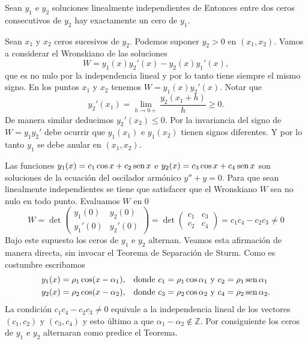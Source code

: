 \begin{teorema}\label{sep_sturm} Sean $y_1$ e $y_2$ soluciones linealmente independientes de 
Entonces entre dos ceros consecutivos de $y_2$ hay exactamente un cero de $y_1$. \end{teorema}
\begin{demo} Sean $x_1$ y $x_2$ ceros sucesivos de $y_2$. Podemos suponer $y_2>0$ en $(x_1,x_2)$. Vamos a considerar el Wronskiano de las soluciones
\[W=y_1(x)y_2'(x)-y_2(x)y_1'(x),\]
que es no nulo por la independencia lineal y por lo tanto tiene siempre el  mismo signo. En los puntos $x_1$ y $x_2$ tenemos $W=y_1(x)y_2'(x)$. Notar que
\[y_2'(x_1)=\lim_{h\to 0+}\frac{y_2(x_1+h)}{h}\geq 0.\]
De  manera similar deducimos $y_2'(x_2)\leq 0$. Por la invariancia del signo de $W=y_1y_2'$ debe ocurrir que $y_1(x_1)$ e $y_1(x_2)$ tienen signos diferentes. Y por lo tanto $y_1$ se debe anular en $(x_1,x_2)$.\end{demo}

\begin{ejemplo} Las funciones $y_1(x)=c_1\cos x+c_2\operatorname{sen} x$ e $y_2(x)=c_3\cos x+c_4\operatorname{sen} x$ son soluciones de la ecuación del oscilador armónico $y''+y=0$. Para que sean linealmente independientes se tiene que satisfacer que el Wronskiano $W$ sea no nulo en todo punto. Evaluamos $W$  en $0$ 
\[W=\det\begin{pmatrix} y_1(0) & y_2(0)\\y_1'(0) & y_2'(0) 
\end{pmatrix}=\det\begin{pmatrix} c_1 & c_3\\c_2 & c_4 
\end{pmatrix}=c_1c_4-c_2c_3\neq 0\]
Bajo este supuesto los ceros de $y_1$ e $y_2$ alternan. Veamos esta afirmación de manera directa, sin invocar el Teorema de Separación de Sturm. Como  es costumbre escribamos 
\[\begin{split}
y_1(x)=\rho_1\cos(x-\alpha_1),&\quad\text{donde } c_1=\rho_1\cos\alpha_1\text{ y }c_2=\rho_1\operatorname{sen}\alpha_1\\
y_2(x)=\rho_2\cos(x-\alpha_2),&\quad\text{donde }c_3=\rho_2\cos\alpha_2\text{ y }c_4=\rho_2\operatorname{sen}\alpha_2.
\end{split}
\]
La condición $c_1c_4-c_2c_3\neq 0$ equivale a la independencia lineal de los vectores $(c_1,c_2)$ y $(c_3,c_4)$ y esto último a que $\alpha_1-\alpha_2\notin\mathbb{Z}$. Por consiguiente los ceros de $y_1$ e $y_2$ alternaran como predice el Teorema. 


\end{ejemplo}

